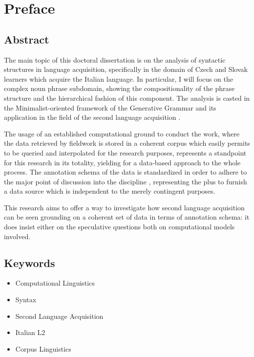 \documentclass[a4paper,twoside,12pt,chapterprefix=false,bibliography=totocnumbered,listof=flat]{scrbook}
\providecommand{\tightlist}{%
  \setlength{\itemsep}{0pt}\setlength{\parskip}{0pt}}
\theoremstyle{definition}
\theoremstyle{definition}
\theoremstyle{definition}
\theoremstyle{remark}
\begin{document}
{
\setcounter{tocdepth}{1}
\tableofcontents
}
\listoftables
\listoffigures
\chapter*{Preface}\label{preface}

\section*{Abstract}\label{abstract}

The main topic of this doctoral dissertation is on the analysis of
syntactic structures in language acquisition, specifically in the domain
of Czech and Slovak learners which acquire the Italian language. In
particular, I will focus on the complex noun phrase subdomain, showing
the compositionality of the phrase structure and the hierarchical
fashion of this component. The analysis is casted in the
Minimalist-oriented framework of the Generative Grammar
\citep{chomsky1995, chomsky1998, chomsky2013, hcf2002} and its
application in the field of the second language acquisition
\citep{rothmanslabakova2017, slabakovalealliskin2014}.

The usage of an established computational ground to conduct the work,
where the data retrieved by fieldwork is stored in a coherent corpus
which easily permits to be queried and interpolated for the research
purposes, represents a standpoint for this research in its totality,
yielding for a data-based approach to the whole process. The annotation
schema of the data is standardized in order to adhere to the major point
of discussion into the discipline
\citep{clark2010, kueblerzinsmeinster2015, kurdi2016}, representing the
plus to furnish a data source which is independent to the merely
contingent purposes.

This research aims to offer a way to investigate how second language
acquisition can be seen grounding on a coherent set of data in terms of
annotation schema: it does insist either on the speculative questions
both on computational models involved.

\section*{Keywords}\label{keywords}

\begin{itemize}
\tightlist
\item
  Computational Linguistics
\item
  Syntax
\item
  Second Language Acquisition
\item
  Italian L2
\item
  Corpus Linguistics
\end{itemize}
\end{document}

